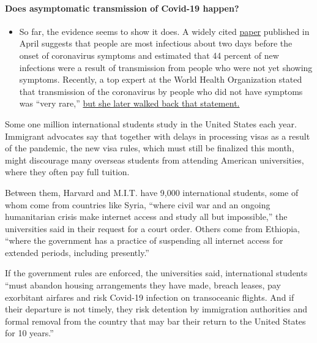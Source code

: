 \begin{itemize}
{  \paragraph{Does asymptomatic transmission of Covid-19
  happen?}\label{does-asymptomatic-transmission-of-covid-19-happen}}

  \begin{itemize}
  \tightlist
  \item
    So far, the evidence seems to show it does. A widely cited
    \href{https://www.nature.com/articles/s41591-020-0869-5}{paper}
    published in April suggests that people are most infectious about
    two days before the onset of coronavirus symptoms and estimated that
    44 percent of new infections were a result of transmission from
    people who were not yet showing symptoms. Recently, a top expert at
    the World Health Organization stated that transmission of the
    coronavirus by people who did not have symptoms was ``very rare,''
    \href{https://www.nytimes.com/2020/06/09/world/coronavirus-updates.html?action=click\&pgtype=Article\&state=default\&region=MAIN_CONTENT_3\&context=storylines_faq\#link-1f302e21}{but
    she later walked back that statement.}
  \end{itemize}
\end{itemize}

Some one million international students study in the United States each
year. Immigrant advocates say that together with delays in processing
visas as a result of the pandemic, the new visa rules, which must still
be finalized this month, might discourage many overseas students from
attending American universities, where they often pay full tuition.

Between them, Harvard and M.I.T. have 9,000 international students, some
of whom come from countries like Syria, ``where civil war and an ongoing
humanitarian crisis make internet access and study all but impossible,''
the universities said in their request for a court order. Others come
from Ethiopia, ``where the government has a practice of suspending all
internet access for extended periods, including presently.''

If the government rules are enforced, the universities said,
international students ``must abandon housing arrangements they have
made, breach leases, pay exorbitant airfares and risk Covid-19 infection
on transoceanic flights. And if their departure is not timely, they risk
detention by immigration authorities and formal removal from the country
that may bar their return to the United States for 10 years.''

